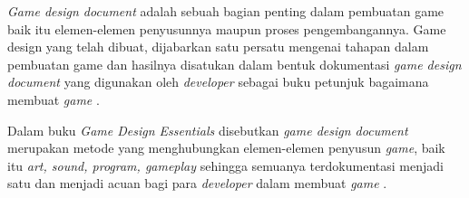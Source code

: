 \textit{Game design document} adalah sebuah bagian penting dalam pembuatan game baik itu elemen-elemen penyusunnya maupun proses pengembangannya. Game design yang telah dibuat, dijabarkan satu persatu mengenai tahapan dalam pembuatan game dan hasilnya disatukan dalam bentuk dokumentasi \textit{game design document} yang digunakan oleh \textit{developer} sebagai buku petunjuk bagaimana membuat \textit{game} \cite{lukito2016}.

Dalam buku \textit{Game Design Essentials} disebutkan \textit{game design document} merupakan metode yang menghubungkan elemen-elemen penyusun \textit{game}, baik itu \textit{art, sound, program, 
gameplay} sehingga semuanya terdokumentasi menjadi satu dan menjadi acuan bagi para \textit{developer} dalam membuat \textit{game} \cite{wibirama2013dual}. 
